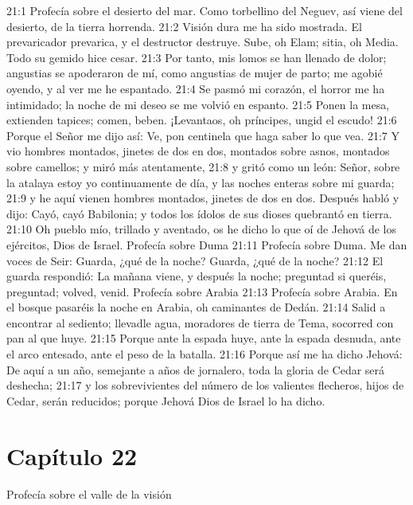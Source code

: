 21:1 Profecía sobre el desierto del mar. Como torbellino del Neguev, así viene del desierto, de la tierra horrenda. 
21:2 Visión dura me ha sido mostrada. El prevaricador prevarica, y el destructor destruye. Sube, oh Elam; sitia, oh Media. Todo su gemido hice cesar. 
21:3 Por tanto, mis lomos se han llenado de dolor; angustias se apoderaron de mí, como angustias de mujer de parto; me agobié oyendo, y al ver me he espantado. 
21:4 Se pasmó mi corazón, el horror me ha intimidado; la noche de mi deseo se me volvió en espanto. 
21:5 Ponen la mesa, extienden tapices; comen, beben. ¡Levantaos, oh príncipes, ungid el escudo! 
21:6 Porque el Señor me dijo así: Ve, pon centinela que haga saber lo que vea. 
21:7 Y vio hombres montados, jinetes de dos en dos, montados sobre asnos, montados sobre camellos; y miró más atentamente, 
21:8 y gritó como un león: Señor, sobre la atalaya estoy yo continuamente de día, y las noches enteras sobre mi guarda; 
21:9 y he aquí vienen hombres montados, jinetes de dos en dos. Después habló y dijo: Cayó, cayó Babilonia; y todos los ídolos de sus dioses quebrantó en tierra. 
21:10 Oh pueblo mío, trillado y aventado, os he dicho lo que oí de Jehová de los ejércitos, Dios de Israel. 
Profecía sobre Duma 
21:11 Profecía sobre Duma. Me dan voces de Seir: Guarda, ¿qué de la noche? Guarda, ¿qué de la noche? 
21:12 El guarda respondió: La mañana viene, y después la noche; preguntad si queréis, preguntad; volved, venid. 
Profecía sobre Arabia 
21:13 Profecía sobre Arabia. En el bosque pasaréis la noche en Arabia, oh caminantes de Dedán. 
21:14 Salid a encontrar al sediento; llevadle agua, moradores de tierra de Tema, socorred con pan al que huye. 
21:15 Porque ante la espada huye, ante la espada desnuda, ante el arco entesado, ante el peso de la batalla. 
21:16 Porque así me ha dicho Jehová: De aquí a un año, semejante a años de jornalero, toda la gloria de Cedar será deshecha; 
21:17 y los sobrevivientes del número de los valientes flecheros, hijos de Cedar, serán reducidos; porque Jehová Dios de Israel lo ha dicho. 
\section*{Capítulo 22 }
Profecía sobre el valle de la visión 
 
